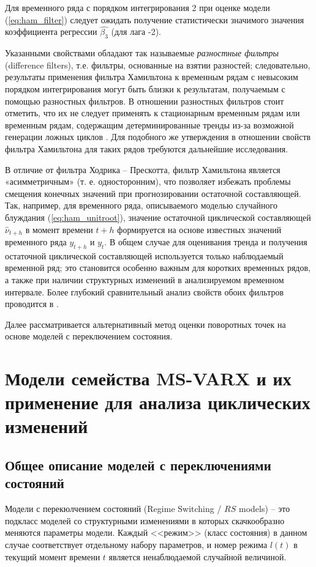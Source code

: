 \documentclass[a4paper,14pt]{extreport}
\begin{document}
	Для временного ряда с порядком интегрирования 2 при оценке модели (\ref{eq:ham_filter}) следует ожидать получение статистически значимого значения коэффициента регрессии $\hat{\beta_3}$  (для лага -2).  
	
	Указанными свойствами обладают так называемые \textit{разностные фильтры} (difference filters), т.\:е. фильтры, основанные на взятии разностей; следовательно, результаты применения фильтра Хамильтона к временным рядам с невысоким порядком интегрирования могут быть близки к результатам, получаемым с помощью разностных фильтров. В отношении разностных фильтров стоит отметить, что их не следует применять к стационарным временным рядам или временным рядам, содержащим детерминированные тренды из-за возможной генерации ложных циклов \cite{schuler_detrend, harvey_detrend}. Для подобного же утверждения в отношении свойств фильтра Хамильтона для таких рядов требуются дальнейшие исследования. 
	
	В отличие от фильтра Ходрика -- Прескотта, фильтр Хамильтона является «асимметричным» (т. е. односторонним), что позволяет избежать проблемы смещения конечных значений при прогнозировании остаточной составляющей. Так, например, для временного ряда, описываемого моделью случайного блуждания (\ref{eq:ham_unitroot}),  значение остаточной циклической составляющей $\hat{\nu}_{t+h}$ в момент времени $t+h$ формируется на основе известных значений временного ряда $y_{t+h}$ и $y_t$. В общем случае для оценивания тренда и получения остаточной циклической составляющей используется только наблюдаемый временной ряд; это становится особенно важным для коротких временных рядов, а также при наличии структурных изменений в анализируемом временном интервале. Более глубокий сравнительный анализ свойств обоих фильтров проводится в \cite{schuler_detrend}.
	
	Далее рассматривается альтернативный метод оценки поворотных точек на основе моделей с переключением состояния.
	

	
	\section{Модели семейства MS-VARX и их применение для анализа циклических изменений}
	
	\subsection{Общее описание моделей с переключениями состояний}
	Модели с перекюлчением состояний (Regime Switching / $RS$ models) -- это подкласс моделей со структурными изменениями в которых скачкообразно меняются параметры модели. Каждый <<режим>> (класс состояния) в данном случае соответствует отдельному набору параметров, и номер режима $l(t)$ в текущий момент времени $t$ является ненаблюдаемой случайной величиной.
	
\end{document}
